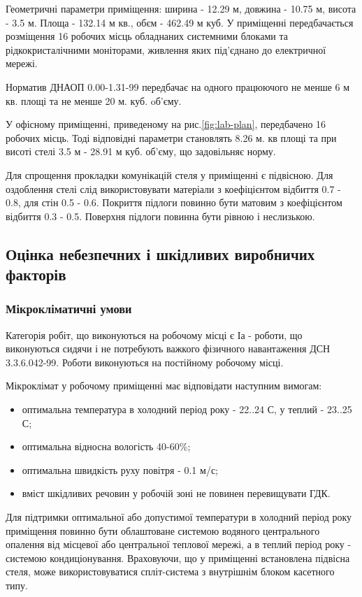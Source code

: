    Геометричні параметри приміщення: ширина - 12.29 м, довжина - 10.75 м, висота - 3.5 м. Площа - 132.14 м кв., обєм - 462.49 м куб.
    У приміщенні передбачається розміщення 16 робочих місць обладнаних системними блоками та рідкокристалічними моніторами, живлення яких під'єднано до електричної мережі.

    Норматив ДНАОП 0.00-1.31-99\cite{lab-dnaop} передбачає на одного працюючого не менше 6 м кв. площі та не менше 20 м. куб. oб'єму.

    У офісному приміщенні, приведеному на рис.\ref{fig:lab-plan}, передбачено 16 робочих місць. Тоді відповідні параметри становлять 8.26 м. кв площі та при висоті стелі 3.5 м -  28.91 м куб. об'єму, що задовільняє норму.

    Для спрощення прокладки комунікацій стеля у приміщенні є підвісною. Для оздоблення стелі слід використовувати матеріали з коефіцієнтом відбиття 0.7 - 0.8, для стін 0.5 - 0.6.
    Покриття підлоги повинно бути матовим з коефіцієнтом відбиття 0.3 - 0.5. Поверхня підлоги повинна бути рівною і неслизькою.

\subsection{Оцінка небезпечних і шкідливих виробничих факторів}
    \subsubsection{Мікрокліматичні умови}
    Категорія робіт, що виконуються на робочому місці є Іа - роботи, що виконуються сидячи і не потребують важкого фізичного навантаження ДСН 3.3.6.042-99\cite{lab-dsn42}. Роботи виконуються на постійному робочому місці.

    Мікроклімат у робочому приміщенні має відповідати наступним вимогам:
    \begin{itemize}
        \item оптимальна температура в холодний період року - 22..24 С, у теплий - 23..25 С;
        \item оптимальна відносна вологість 40-60\%;
        \item оптимальна швидкість руху повітря - 0.1 м/с;
        \item вміст шкідливих речовин у робочій зоні не повинен перевищувати ГДК.
    \end{itemize}

    Для підтримки оптимальної або допустимої температури в холодний період року приміщення повинно бути облаштоване системою водяного центрального опалення від місцевої або центральної теплової мережі, а в теплий період року - системою кондиціонування. Враховуючи, що у приміщенні встановлена підвісна стеля, може використовуватися спліт-система з внутрішнім блоком касетного типу.

